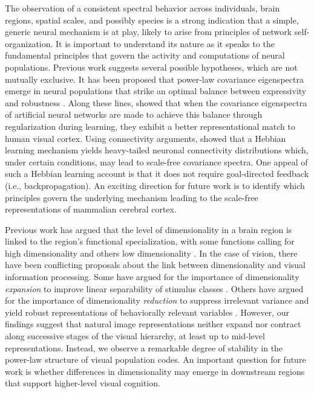 \documentclass[10pt]{article}
\begin{document}
The observation of a consistent spectral behavior across individuals,
brain regions, spatial scales, and possibly species is a strong
indication that a simple, generic neural mechanism is at play, likely to
arise from principles of network self-organization. It is important to
understand its nature as it speaks to the fundamental principles that
govern the activity and computations of neural populations. Previous
work suggests several possible hypotheses, which are not mutually
exclusive. It has been proposed that power-law covariance eigenspectra
emerge in neural populations that strike an optimal balance between
expressivity and robustness \autocite{Stringer2019}. Along these lines,
\textcite{Prince2024} showed that when the covariance eigenspectra of
artificial neural networks are made to achieve this balance through
regularization during learning, they exhibit a better representational
match to human visual cortex. Using connectivity arguments,
\textcite{Lynn2024} showed that a Hebbian learning mechanism yields
heavy-tailed neuronal connectivity distributions which, under certain
conditions, may lead to scale-free covariance spectra. One appeal of
such a Hebbian learning account is that it does not require
goal-directed feedback (i.e., backpropagation). An exciting direction
for future work is to identify which principles govern the underlying
mechanism leading to the scale-free representations of mammalian
cerebral cortex.

Previous work has argued that the level of dimensionality in a brain
region is linked to the region's functional specialization, with some
functions calling for high dimensionality and others low dimensionality
\autocites[e.g.][]{Fusi2016,CaycoGajic2019}. In the case of vision,
there have been conflicting proposals about the link between
dimensionality and visual information processing. Some have argued for
the importance of dimensionality \emph{expansion} to improve linear
separability of stimulus classes \autocite{Elmoznino2024,Babadi2014}.
Others have argued for the importance of dimensionality \emph{reduction}
to suppress irrelevant variance and yield robust representations of
behaviorally relevant variables
\autocite{Ansuini2019,Cohen2020,Lehky2016,Fusi2016}. However, our
findings suggest that natural image representations neither expand nor
contract along successive stages of the visual hierarchy, at least up to
mid-level representations. Instead, we observe a remarkable degree of
stability in the power-law structure of visual population codes. An
important question for future work is whether differences in
dimensionality may emerge in downstream regions that support
higher-level visual cognition.
\end{document}
